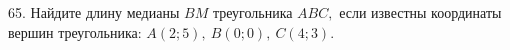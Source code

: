 65. Найдите длину медианы $BM$ треугольника $ABC,$ если известны координаты вершин треугольника: $A(2;5),\ B(0;0),\ C(4;3).$\\
